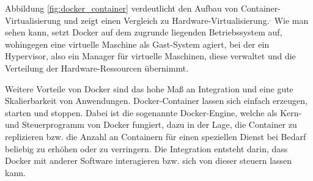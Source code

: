Abbildung \ref{fig:docker_container} verdeutlicht den Aufbau von Container-Virtualisierung und zeigt einen Vergleich zu Hardware-Virtualisierung.\autocite[Vgl.][]{MS-ChrissiKraus.27.07.2018}$^,$\autocite[Vgl.][]{MS-MicrosoftCorporation.31.08.2018} 
Wie man sehen kann, setzt Docker auf dem zugrunde liegenden Betriebssystem auf, wohingegen eine virtuelle Maschine als Gast-System agiert, bei der ein Hypervisor, also ein Manager für virtuelle Maschinen\autocite[Vgl.][]{MS-ReneBust.06.04.2010}, diese verwaltet und die Verteilung der Hardware-Ressourcen übernimmt.

Weitere Vorteile von Docker sind das hohe Maß an Integration und eine gute Skalierbarkeit von Anwendungen. 
Docker-Container lassen sich einfach erzeugen, starten und stoppen. 
Dabei ist die sogenannte Docker-Engine, welche als Kern- und Steuerprogramm von Docker fungiert, dazu in der Lage, die Container zu replizieren bzw. die Anzahl an Containern für einen speziellen Dienst bei Bedarf beliebig zu erhöhen oder zu verringern. 
Die Integration entsteht darin, dass Docker mit anderer Software interagieren bzw. sich von dieser steuern lassen kann.